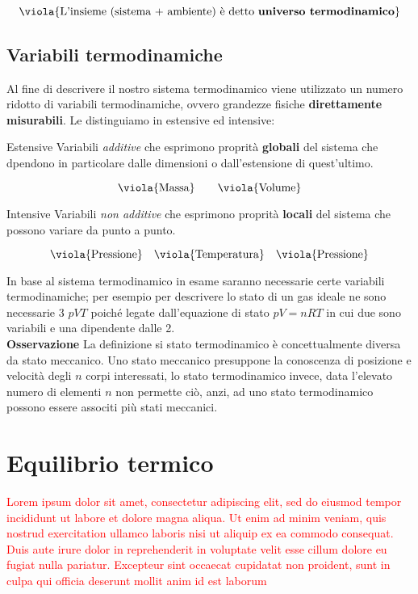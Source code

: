 \[ 
\viola{\text{{L'insieme (sistema + ambiente) è detto \textbf{universo termodinamico}}}}
\]
\subsection{Variabili termodinamiche}
Al fine di descrivere il nostro sistema termodinamico viene utilizzato un numero ridotto di variabili termodinamiche, ovvero grandezze fisiche \textbf{direttamente misurabili}. Le distinguiamo in estensive ed intensive:

\begin{center}
	\begin{minipage}{0.49\textwidth}
		\begin{es}{Estensive}
			Variabili \textit{additive} che esprimono proprità \textbf{globali} del sistema che dpendono in particolare dalle dimensioni o dall'estensione di quest'ultimo.
			
			\[\viola{\text{Massa}} \qquad \viola{\text{Volume}}\]
			
		\end{es}
	\end{minipage}
	\begin{minipage}{0.49\textwidth}
		\begin{es}{Intensive}
			Variabili \textit{non additive} che esprimono proprità \textbf{locali} del sistema che possono variare da punto a punto.
			
			\[\viola{\text{Pressione}} \quad \viola{\text{Temperatura}}\quad \viola{\text{Pressione}}\]
			
		\end{es}
	\end{minipage}
\end{center}
In base al sistema termodinamico in esame saranno necessarie certe variabili termodinamiche; per esempio per descrivere lo stato di un gas ideale ne sono necessarie 3 \(pVT\) poiché legate dall'equazione di stato \( pV = nRT\) in cui due sono variabili e una dipendente dalle 2.\\

\noindent
\textbf{Osservazione}  La definizione si stato termodinamico è concettualmente diversa da stato meccanico. Uno stato meccanico presuppone la conoscenza di posizione e velocità degli \(n\) corpi interessati, lo stato termodinamico invece, data l'elevato numero di elementi \(n\) non permette ciò, anzi, ad uno stato termodinamico possono essere associti più stati meccanici.

\section{Equilibrio termico}
\textcolor{red}{Lorem ipsum dolor sit amet, consectetur adipiscing elit, sed do eiusmod tempor incididunt ut labore et dolore magna aliqua. Ut enim ad minim veniam, quis nostrud exercitation ullamco laboris nisi ut aliquip ex ea commodo consequat. Duis aute irure dolor in reprehenderit in voluptate velit esse cillum dolore eu fugiat nulla pariatur. Excepteur sint occaecat cupidatat non proident, sunt in culpa qui officia deserunt mollit anim id est laborum}\\

